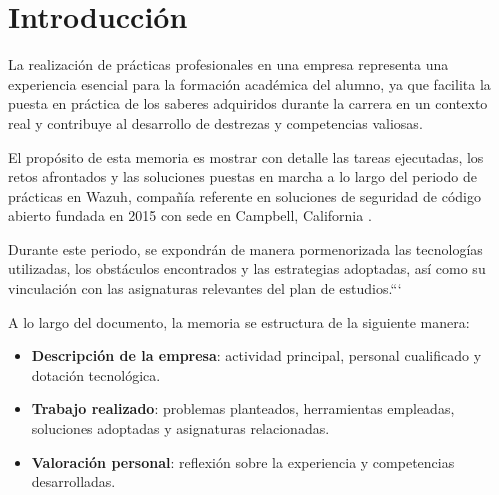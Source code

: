 \chapter{Introducción}

La realización de prácticas profesionales en una empresa representa una experiencia esencial para la formación académica del alumno, ya que facilita la puesta en práctica de los saberes adquiridos durante la carrera en un contexto real y contribuye al desarrollo de destrezas y competencias valiosas.

El propósito de esta memoria es mostrar con detalle las tareas ejecutadas, los retos afrontados y las soluciones puestas en marcha a lo largo del periodo de prácticas en Wazuh, compañía referente en soluciones de seguridad de código abierto fundada en 2015 con sede en Campbell, California \cite{wazuh_about_us}.

Durante este periodo, se expondrán de manera pormenorizada las tecnologías utilizadas, los obstáculos encontrados y las estrategias adoptadas, así como su vinculación con las asignaturas relevantes del plan de estudios.```


A lo largo del documento, la memoria se estructura de la siguiente manera:
\begin{itemize}
  \item \textbf{Descripción de la empresa}: actividad principal, personal cualificado y dotación tecnológica.
  \item \textbf{Trabajo realizado}: problemas planteados, herramientas empleadas, soluciones adoptadas y asignaturas relacionadas.
  \item \textbf{Valoración personal}: reflexión sobre la experiencia y competencias desarrolladas.
\end{itemize}

